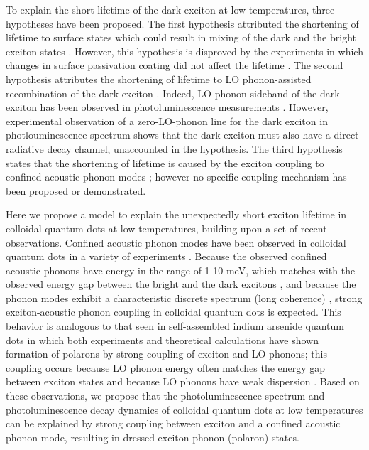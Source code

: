 \documentclass[aps,pra,preprint,groupedaddress]{revtex4-1}
\begin{document}
To explain the short lifetime of the dark exciton at low temperatures, three hypotheses have been proposed. The first hypothesis attributed the shortening of lifetime to surface states which could result in mixing of the dark and the bright exciton states \cite{Califano2005}. However, this hypothesis is disproved by the experiments in which changes in surface passivation coating did not affect the lifetime \cite{Crooker2003, DeMelloDonega2006}. The second hypothesis attributes the shortening of lifetime to LO phonon-assisted recombination of the dark exciton \cite{Crooker2003}. Indeed, LO phonon sideband of the dark exciton has been observed in photoluminescence measurements \cite{Biadala2009}. However, experimental observation of a zero-LO-phonon line for the dark exciton in photlouminescence spectrum  \cite{Biadala2009} shows that the dark exciton must also have a direct radiative decay channel, unaccounted in the hypothesis. The third hypothesis states that the shortening of lifetime is caused by the exciton coupling to confined acoustic phonon modes \cite{Oron2009, Huxter2010, Eilers2014, Rodina2015, Rodina2016}; however no specific coupling mechanism has been proposed or demonstrated.

Here we propose a model to explain the unexpectedly short exciton lifetime in colloidal quantum dots at low temperatures, building upon a set of recent observations. Confined acoustic phonon modes have been observed in colloidal quantum dots in a variety of experiments \cite{Saviot1996,Woggon1996, Sagar2008, Oron2009, Chilla2008,GranadosDelAguila2014,Werschler2016}. Because the observed confined acoustic phonons have energy in the range of 1-10 meV, which matches with the observed energy gap between the bright and the dark excitons \cite{Efros1996, Crooker2003}, and because the phonon modes exhibit a characteristic discrete spectrum (long coherence) \cite{Chilla2008,Werschler2016}, strong exciton-acoustic phonon coupling in colloidal quantum dots is expected. This behavior is analogous to that seen in self-assembled indium arsenide quantum dots in which both experiments and theoretical calculations have shown formation of polarons by strong coupling of exciton and LO phonons; this coupling occurs because LO phonon energy often matches the energy gap between exciton states and because LO phonons have weak dispersion \cite{Preisler2006, Hameau2002, Hameau1999, Sarkar2005, Knipp1997, Verzelen2002}. Based on these observations, we propose that the photoluminescence spectrum and photoluminescence decay dynamics of colloidal quantum dots at low temperatures can be explained by strong coupling between exciton and a confined acoustic phonon mode, resulting in dressed exciton-phonon (polaron) states. 
\end{document}
